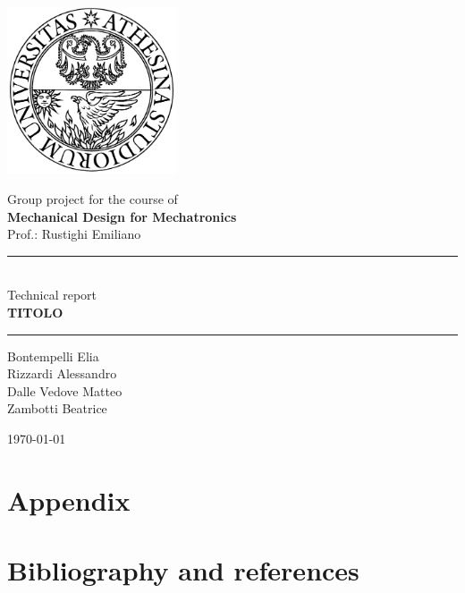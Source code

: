 \documentclass[11pt,a4paper]{article}
\begin{document}
	
	\thispagestyle{empty}
	\begin{center}
		\includegraphics[width=5cm]{logouni}
		\vspace{2cm}
		
		{\Large Group project for the course of \\ \vspace{3mm}
		\textbf{Mechanical Design for Mechatronics} \\ \vspace{1cm}
		Prof.: Rustighi Emiliano} \vspace{1cm}
	
		\rule{5cm}{0.5pt} \\ \vspace{1cm}
		{\Large Technical report} \\ \vspace{3mm}
		{\LARGE \textbf{TITOLO}} \\ \vspace{1cm}
		
		\rule{5cm}{0.5pt} \vspace{1cm}
		
		\begin{multicols}{2}
			Bontempelli Elia \\
			Rizzardi Alessandro \\
			Dalle Vedove Matteo \\
			Zambotti Beatrice
		\end{multicols}
		\vspace{1cm}
		
		\today
		
	\end{center}
	
	\newpage
	\tableofcontents
	
	\newpage
	
	\setcounter{page}{1}
	
	
	
	
	
	
	
	
	
	\appendix	
	
	
	
	\newpage
	\section{Appendix}
	\newpage
	\section{Bibliography and references}
	\printbibliography[heading=none]
	
	\newpage
	
	
\end{document}
